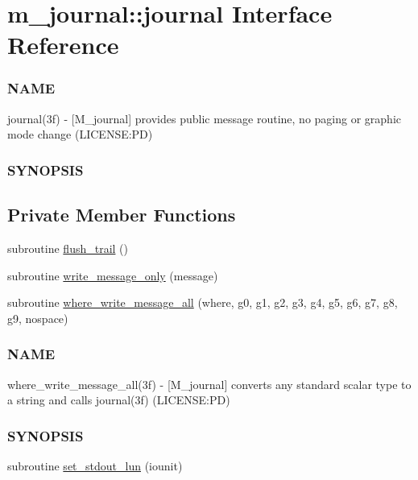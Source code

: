 \hypertarget{interfacem__journal_1_1journal}{}\section{m\+\_\+journal\+:\+:journal Interface Reference}
\label{interfacem__journal_1_1journal}


\subsubsection*{N\+A\+ME}

journal(3f) -\/ \mbox{[}M\+\_\+journal\mbox{]} provides public message routine, no paging or graphic mode change (L\+I\+C\+E\+N\+SE\+:PD) \subsubsection*{S\+Y\+N\+O\+P\+S\+IS} 


\subsection*{Private Member Functions}
\begin{DoxyCompactItemize}
\item 
subroutine \mbox{\hyperlink{interfacem__journal_1_1journal_acdde0ed4590797094f797514820e34fc}{flush\+\_\+trail}} ()
\item 
subroutine \mbox{\hyperlink{interfacem__journal_1_1journal_a1cb40f602a1e1c546bce71652a779d31}{write\+\_\+message\+\_\+only}} (message)
\item 
subroutine \mbox{\hyperlink{interfacem__journal_1_1journal_ae6136e918d4383d1c463c536a3eb814a}{where\+\_\+write\+\_\+message\+\_\+all}} (where, g0, g1, g2, g3, g4, g5, g6, g7, g8, g9, nospace)
\begin{DoxyCompactList}\small\item\em \subsubsection*{N\+A\+ME}

where\+\_\+write\+\_\+message\+\_\+all(3f) -\/ \mbox{[}M\+\_\+journal\mbox{]} converts any standard scalar type to a string and calls journal(3f) (L\+I\+C\+E\+N\+SE\+:PD) \subsubsection*{S\+Y\+N\+O\+P\+S\+IS}\end{DoxyCompactList}\item 
subroutine \mbox{\hyperlink{interfacem__journal_1_1journal_a78f9c4a4314847963a2feae798ff54c1}{set\+\_\+stdout\+\_\+lun}} (iounit)
\end{DoxyCompactItemize}


